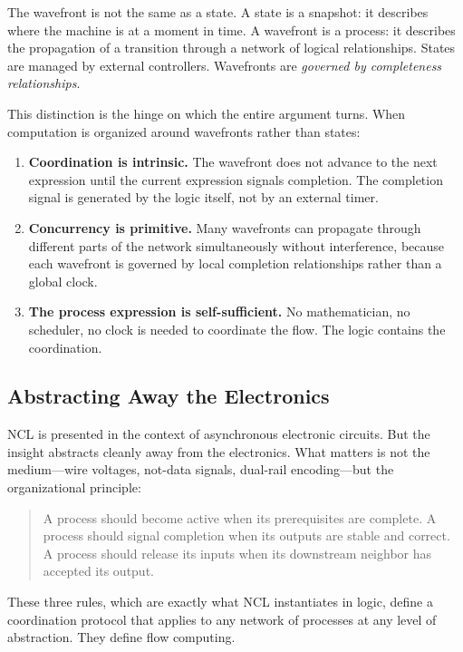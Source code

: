 \documentclass[12pt, a4paper]{article}
\begin{document}
The wavefront is not the same as a state. A state is a snapshot: it
describes where the machine is at a moment in time. A wavefront is a
process: it describes the propagation of a transition through a network
of logical relationships. States are managed by external controllers.
Wavefronts are \emph{governed by completeness relationships}.

This distinction is the hinge on which the entire argument turns. When
computation is organized around wavefronts rather than states:

\begin{enumerate}
\item \textbf{Coordination is intrinsic.} The wavefront does not
  advance to the next expression until the current expression
  signals completion. The completion signal is generated by the
  logic itself, not by an external timer.

\item \textbf{Concurrency is primitive.} Many wavefronts can propagate
  through different parts of the network simultaneously without
  interference, because each wavefront is governed by local completion
  relationships rather than a global clock.

\item \textbf{The process expression is self-sufficient.} No
  mathematician, no scheduler, no clock is needed to coordinate the
  flow. The logic contains the coordination.
\end{enumerate}

\subsection{Abstracting Away the Electronics}

NCL is presented in the context of asynchronous electronic circuits.
But the insight abstracts cleanly away from the electronics. What
matters is not the medium---wire voltages, not-data signals,
dual-rail encoding---but the organizational principle:

\begin{quote}
A process should become active when its prerequisites are complete.
A process should signal completion when its outputs are stable and correct.
A process should release its inputs when its downstream neighbor
has accepted its output.
\end{quote}

These three rules, which are exactly what NCL instantiates in logic,
define a coordination protocol that applies to any network of processes
at any level of abstraction. They define flow computing.
\end{document}

